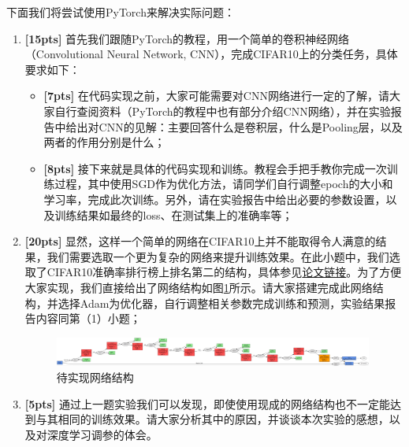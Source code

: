 \documentclass[a4paper,UTF8]{article}
\numberwithin{equation}{section}
\begin{document}
下面我们将尝试使用PyTorch来解决实际问题：

\begin{enumerate}[(1)]
	\item \textbf{[15pts]} 首先我们跟随PyTorch的教程，用一个简单的卷积神经网络（Convolutional Neural Network, CNN），完成CIFAR10上的分类任务，具体要求如下：
	
	\begin{itemize}
		\item \textbf{[7pts]} 在代码实现之前，大家可能需要对CNN网络进行一定的了解，请大家自行查阅资料（PyTorch的教程中也有部分介绍CNN网络），并在实验报告中给出对CNN的见解：主要回答什么是卷积层，什么是Pooling层，以及两者的作用分别是什么；
		\item \textbf{[8pts]} 接下来就是具体的代码实现和训练。教程会手把手教你完成一次训练过程，其中使用SGD作为优化方法，请同学们自行调整epoch的大小和学习率，完成此次训练。另外，请在实验报告中给出必要的参数设置，以及训练结果如最终的loss、在测试集上的准确率等；
	\end{itemize}
	\item \textbf{[20pts]} 显然，这样一个简单的网络在CIFAR10上并不能取得令人满意的结果，我们需要选取一个更为复杂的网络来提升训练效果。在此小题中，我们选取了CIFAR10准确率排行榜上排名第二的结构，具体参见\href{https://arxiv.org/pdf/1412.6806.pdf}{论文链接}。为了方便大家实现，我们直接给出了网络结构如图\ref{network_structure}所示。请大家搭建完成此网络结构，并选择Adam为优化器，自行调整相关参数完成训练和预测，实验结果报告内容同第（1）小题；
	\begin{figure}[!h]
		\centering   
		\includegraphics[width=0.99\textwidth, height=0.15\textwidth]{nn_structure.png}  
		\caption{待实现网络结构} 
		\label{network_structure}
	\end{figure}
	\item \textbf{[5pts]} 通过上一题实验我们可以发现，即使使用现成的网络结构也不一定能达到与其相同的训练效果。请大家分析其中的原因，并谈谈本次实验的感想，以及对深度学习调参的体会。
\end{enumerate}

\end{document}
